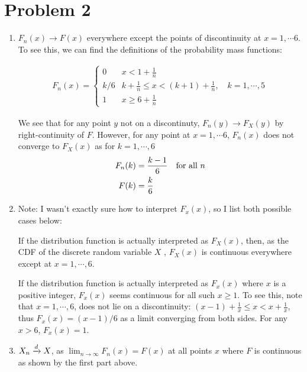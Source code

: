 \documentclass[12pt]{article}%
\begin{document}
\section{Problem 2}
\begin{enumerate}
  \item $F_n(x) \rightarrow F(x)$ everywhere except the points of discontinuity at $x = 1, \cdots 6$. To see this, we can find the definitions of the probability mass functions:

  \begin{align*}
      F_n(x) = \begin{cases}
          0 & x < 1 + \frac{1}{n} \\
          k/6 & k + \frac{1}{n} \leq x < (k+1) + \frac{1}{n}, \quad k= 1, \cdots, 5 \\
          1 & x \geq 6 + \frac{1}{n}
        \end{cases}
  \end{align*}

  We see that for any point $y$ not on a discontinuty, $F_n(y) \rightarrow F_X(y)$ by right-continuity of $F$. However, for any point at $x = 1,\cdots 6$, $F_n(x)$ does not converge to $F_X(x)$ as for $k = 1,\cdots,6$
  \begin{align*}
    F_n(k) & = \frac{k-1}{6} \text{\quad for all $n$} \\
    F(k) & = \frac{k}{6}
  \end{align*}

  \item
  Note: I wasn't exactly sure how to interpret $F_x(x)$, so I list both possible cases below:

  If the distribution function is actually interpreted as $F_X(x)$, then, as the CDF of the discrete random variable $X$ , $F_X(x)$ is continuous everywhere except at $x =  1, \cdots, 6$.


  If the distribution function is actually interpreted as $F_x(x)$ where $x$ is a positive integer,  $F_x(x)$ seems continuous for all such $x \geq 1$. To see this, note that $x = 1, \cdots, 6$, does not lie on a discontinuity: $(x-1) + \frac{1}{x} \leq x < x + \frac{1}{x}$, thus $F_x(x) = (x-1)/6$ as a limit converging from both sides. For any $x > 6$, $F_x(x) = 1$.

  \item $X_n \xrightarrow[]{d} X$, as $\lim_{n \rightarrow \infty}F_n(x) = F(x)$ at all points $x$ where $F$ is continuous as shown by the first part above.
\end{enumerate}
\end{document}
